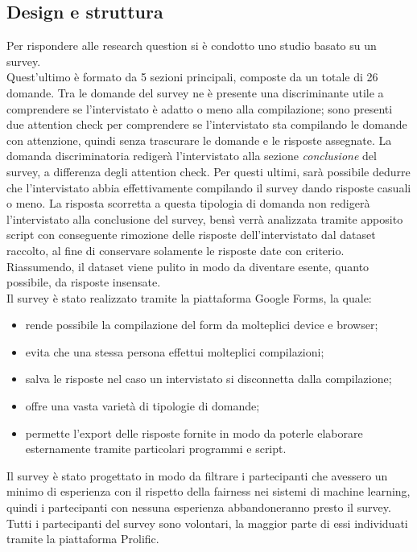 \subsection{Design e struttura}
Per rispondere alle research question si è condotto uno studio basato su un survey.\\
Quest'ultimo è formato da 5 sezioni principali, composte da un totale di 26 domande. Tra le domande del survey ne è presente una discriminante utile a comprendere se l'intervistato è adatto o meno alla compilazione; sono presenti due attention check per comprendere se l'intervistato sta compilando le domande con attenzione, quindi senza trascurare le domande e le risposte assegnate. La domanda discriminatoria redigerà l'intervistato alla sezione \emph{conclusione} del survey, a differenza degli attention check. Per questi ultimi, sarà possibile dedurre che l'intervistato abbia effettivamente compilando il survey dando risposte casuali o meno. La risposta scorretta a questa tipologia di domanda non redigerà l'intervistato alla conclusione del survey, bensì verrà analizzata tramite apposito script con conseguente rimozione delle risposte dell'intervistato dal dataset raccolto, al fine di conservare solamente le risposte date con criterio. Riassumendo, il dataset viene pulito in modo da diventare esente, quanto possibile, da risposte insensate.\\
Il survey è stato realizzato tramite la piattaforma Google Forms, la quale:
\begin{itemize}
    \item rende possibile la compilazione del form da molteplici device e browser;
    \item evita che una stessa persona effettui molteplici compilazioni;
    \item salva le risposte nel caso un intervistato si disconnetta dalla compilazione;
    \item offre una vasta varietà di tipologie di domande;
    \item permette l'export delle risposte fornite in modo da poterle elaborare esternamente tramite particolari programmi e script.
\end{itemize}
Il survey è stato progettato in modo da filtrare i partecipanti che avessero un minimo di esperienza con il rispetto della fairness nei sistemi di machine learning, quindi i partecipanti con nessuna esperienza abbandoneranno presto il survey. Tutti i partecipanti del survey sono volontari, la maggior parte di essi individuati tramite la piattaforma Prolific.\\
